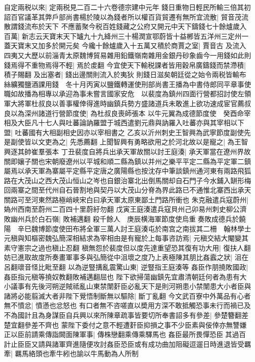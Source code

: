 自定兩税以來|{
	定兩税見二百二十六卷德宗建中元年}
錢日重物日輕民所輸三倍其初詔百官議革其弊戶部尚書楊於陵以為錢者所以權百貨貿遷有無所宜流散|{
	貿音茂流散謂錢流布於天下}
不應蓄聚今税百姓錢藏之公府又開元中天下鑄錢七十餘爐歲入百萬|{
	新志云天寶末天下罏九十九絳州三十楊潤宣鄂蔚皆十益郴皆五洋州三定州一蓋天寶末又加多於開元矣}
今纔十餘爐歲入十五萬又積於商賈之室|{
	賈音古}
及流入四夷又大歷以前淄青太原魏博貿易雜用鉛鐵嶺南雜用金銀丹砂象齒今一用錢如此則錢焉得不重物焉得不輕|{
	焉於䖍翻}
今宜使天下輸税課者皆用穀帛廣鑄錢而禁滯積|{
	積子賜翻}
及出塞者|{
	錢出邊關則流入於夷狄}
則錢日滋矣朝廷從之始令兩税皆輸布絲纊獨鹽酒課用錢　冬十月丙寅以鹽鐵轉運使刑部尚書王播為中書侍郎同平章事使職如故播為相專以承迎為事未嘗言國家安危　以裴度為鎮州四面行營都招討使左領軍大將軍杜叔良以善事權倖得進時幽鎮兵勢方盛諸道兵未敢進上欲功速成宦官薦叔良以為深州諸道行營節度使|{
	為杜叔良喪師張本}
以牛元翼為成德節度使　癸酉命宰相及大臣凡十七人與吐蕃論訥羅盟于城西遣劉元鼎與訥羅入吐蕃亦與其宰相以下盟|{
	吐蕃國有大相副相史因亦以宰相書之}
乙亥以沂州刺史王智興為武寧節度副使先是副使皆以文吏為之|{
	先悉薦翻}
上聞智興有勇略欲用之於河北故以是寵之|{
	為王智興逐其帥崔羣張本}
丁丑裴度自將兵出承天軍故關以討王庭湊|{
	承天軍當在遼州界故關即孃子關也宋朝廢遼州以平城和順二縣為鎮以并州之樂平平定二縣為平定軍二鎮屬焉以承天軍為寨屬平定縣平定唐之廣陽縣也按沈存中筆談鎮州通河東有兩路飛狐路在大茂山之西大茂山恒山之岑也自銀治寨北出倒馬關却自石門子今水鋪入缾形梅回兩寨之間至代州自石晉割地與契丹以大茂山分脊為界此路已不通惟北寨西出承天關路可至河東然路極峭峽宋白曰承天軍太原東鄙土門路所衝也}
朱克融遣兵寇蔚州|{
	媯州西南至蔚州二百四十里蔚紆勿翻}
戊寅王庭湊遣兵寇貝州己卯易州刺史柳公濟敗幽州兵於白石嶺|{
	敗補邁翻}
殺千餘人　庚辰横海軍節度使烏重奏敗成德兵於饒陽　辛巳魏博節度使田布將全軍三萬人討王庭湊屯於南宫之南拔其二柵　翰林學士元稹與知樞密魏弘簡深相結求為宰相由是有寵於上每事咨訪焉|{
	元稹交結大閹變其素守憲宗之過也稹止忍翻}
稹無怨於裴度但以度先達重望恐其復有功大用|{
	復扶人翻}
妨已進取故度所奏畫軍事多與弘簡從中沮壞之度乃上表極陳其朋比姦蠧之狀|{
	沮在呂翻瓌音怪比毗至翻}
以為逆豎搆亂震驚山東|{
	逆豎指王庭湊等}
姦臣作朋撓敗國政|{
	姦臣指元稹等撓奴教翻敗補邁翻屈也}
陛下欲掃蕩幽鎮先宜肅清朝廷何者為患有大小議事有先後河朔逆賊祗亂山東禁闈姧臣必亂天下是則河朔患小禁闈患大小者臣與諸將必能翦滅大者非陛下覺悟制斷無以驅除|{
	斷丁亂翻}
今文武百寮中外萬品有心者無不憤忿|{
	憤懣也忿怒也}
有口者無不咨嗟直以奬用方深不敢抵觸恐事未行而禍已及不為國計且為身謀臣自兵興以來所陳章疏事皆要切所奉書詔多有參差|{
	參楚簪翻差楚宜翻參差不齊也}
蒙陛下委付之意不輕遭姧臣抑損之事不少臣素與佞倖亦無讐嫌正以臣前請乘傳詣闕面陳軍事|{
	傳株戀翻乘傳乘驛馬也}
姦臣最所畏憚恐臣其過百計止臣臣又請與諸軍齊進隨便攻討姦臣恐臣或有成功曲加阻礙逗遛日時進退皆受羈牽|{
	羈馬絡頭也牽牛紖也諭以牛馬動為人所制}
